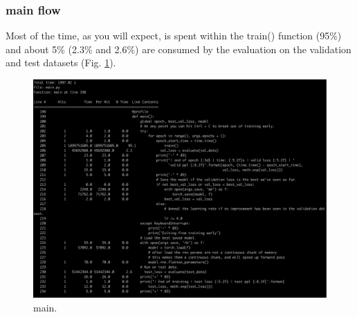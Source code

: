 \documentclass[11pt]{article}
\newcommand{\0}{\mat{0}}
\begin{document}
\begin{itemize}
  \subsubsection*{main flow}
   Most of the time, as you will expect, is spent within the train() function (95\%) and  about 5\% (2.3\% and 2.6\%)  are consumed by the evaluation on the validation and test datasets (Fig. \ref{fig:main}).
   \begin{figure}[ht!]
  	\centering
 	 \includegraphics[width=\linewidth]{main.png}
 	 \caption{main.}
 	 \label{fig:main}
   \end{figure}


\end{itemize}
\end{document}
